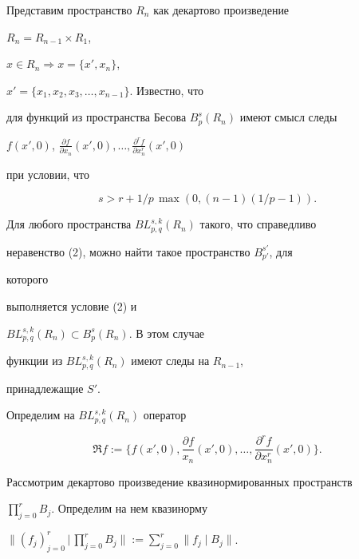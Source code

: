  


Представим пространство $R_n$ как декартово произведение 


$R_n=R_{n-1}\times R_1$, 


$x\in R_n\Rightarrow x=\{x',x_n\}$, 


$x'=\{x_1,x_2,x_3,\dotsc,x_{n-1}\}$. Известно, что 


для функций из пространства Бесова $B^s_p(R_n)$ имеют смысл следы 


$f(x',0)$, $\frac{\partial f}{\partial x_n}(x',0),\dotsc, 


\frac{\partial^r f}{\partial x^r_n}(x',0)$ 


при условии, что 


\begin{equation} 


s>r+1/p\,\max(0,(n-1)(1/p-1)). 


\end{equation} 


 


Для любого пространства $BL^{s,k}_{p,q}(R_n)$ такого, что справедливо 


неравенство (2), можно найти такое пространство $B^{s'}_{p'}$, для 


которого 


выполняется условие (2) и 


$BL^{s,k}_{p,q}(R_n)\subset B^s_p(R_n)$. В этом случае 


функции из $BL^{s,k}_{p,q}(R_n)$ имеют следы на $R_{n-1}$, 


принадлежащие $S'$. 


Определим на $BL^{s,k}_{p,q}(R_n)$ оператор 


$$ 


\Re f:=\Big\{f(x',0),\frac{\partial f}{x_n}(x',0),\dotsc, 


\frac{\partial^r f}{\partial x^r_n}(x',0)\Big\}. 


$$ 


 


Рассмотрим декартово произведение квазинормированных пространств 


$\prod\limits^r_{j=0}B_j$. Определим на нем квазинорму 


$\Big\|(f_j)^r_{j=0}\,\Big|\,\prod\limits^r_{j=0}B_j\Big\|:= 


\sum\limits^r_{j=0}\|f_j\mid B_j\|$. 


 


